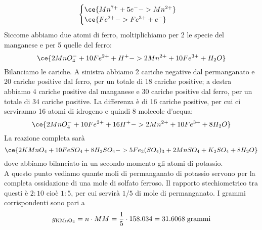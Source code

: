 \begin{soluzione}
\begin{equation*}
\begin{cases}
            \ce{Mn^{7+} + 5e^- -> Mn^{2+}}\\
            \ce{Fe^{2+} -> Fe^{3+} + e^-}
        \end{cases}
    \end{equation*}
    Siccome abbiamo due atomi di ferro, moltiplichiamo per 2 le specie del manganese e per 5 quelle del ferro:
    \begin{equation*}
        \ce{2MnO_4^- + 10Fe^{2+} + H^+ -> 2Mn^{2+} + 10Fe^{3+} + H_2O}
    \end{equation*}
    Bilanciamo le cariche. A sinistra abbiamo 2 cariche negative dal permanganato e 20 cariche positive dal ferro, per un totale di 18 cariche positive; a destra abbiamo 4 cariche positive dal manganese e 30 cariche positive dal ferro, per un totale di 34 cariche positive. La differenza è di 16 cariche positive, per cui ci serviranno 16 atomi di idrogeno e quindi 8 molecole d'acqua:
    \begin{equation*}
        \ce{2MnO_4^- + 10Fe^{2+} + 16H^+ -> 2Mn^{2+} + 10Fe^{3+} + 8H_2O}
    \end{equation*}
    La reazione completa sarà
    \begin{equation*}
        \ce{2KMnO_4 + 10FeSO_4 + 8H_2SO_4 -> 5Fe_2(SO_4)_3 + 2MnSO_4 + K_2SO_4 + 8H_2O}
    \end{equation*}
    dove abbiamo bilanciato in un secondo momento gli atomi di potassio.\\
    A questo punto vediamo quante moli di permanganato di potassio servono per la completa ossidazione di una mole di solfato ferroso. Il rapporto stechiometrico tra questi è $2:10$ cioè $1:5$, per cui servirà $1/5$ di mole di permanganato. I grammi corrispondenti sono pari a
    \begin{equation*}
        g_{\rm KMnO_4}
        =n \cdot MM
        =\frac{1}{5} \cdot 158.034
        =31.6068 \; \rm grammi
    \end{equation*}
\end{soluzione}

\newpage

